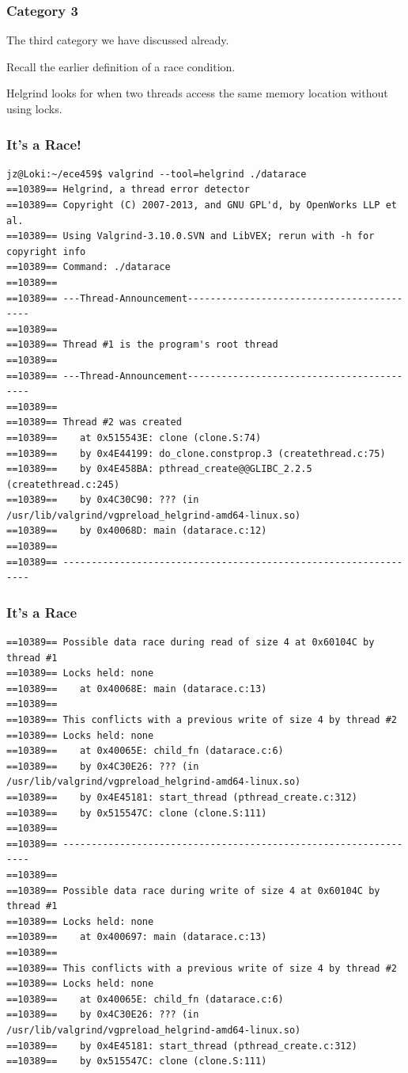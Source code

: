 \begin{frame}
\frametitle{Category 3}

The third category we have discussed already.

  Recall the earlier definition of a race condition. 

 Helgrind looks for when two threads access the same memory location without using locks.

\end{frame}

\begin{frame}[fragile]
\frametitle{It's a Race!}
{\scriptsize
\begin{verbatim}
jz@Loki:~/ece459$ valgrind --tool=helgrind ./datarace
==10389== Helgrind, a thread error detector
==10389== Copyright (C) 2007-2013, and GNU GPL'd, by OpenWorks LLP et al.
==10389== Using Valgrind-3.10.0.SVN and LibVEX; rerun with -h for copyright info
==10389== Command: ./datarace
==10389== 
==10389== ---Thread-Announcement------------------------------------------
==10389== 
==10389== Thread #1 is the program's root thread
==10389== 
==10389== ---Thread-Announcement------------------------------------------
==10389== 
==10389== Thread #2 was created
==10389==    at 0x515543E: clone (clone.S:74)
==10389==    by 0x4E44199: do_clone.constprop.3 (createthread.c:75)
==10389==    by 0x4E458BA: pthread_create@@GLIBC_2.2.5 (createthread.c:245)
==10389==    by 0x4C30C90: ??? (in /usr/lib/valgrind/vgpreload_helgrind-amd64-linux.so)
==10389==    by 0x40068D: main (datarace.c:12)
==10389== 
==10389== ----------------------------------------------------------------
\end{verbatim}
}

\end{frame}

\begin{frame}[fragile]
\frametitle{It's a Race}
{\scriptsize
\begin{verbatim}
==10389== Possible data race during read of size 4 at 0x60104C by thread #1
==10389== Locks held: none
==10389==    at 0x40068E: main (datarace.c:13)
==10389== 
==10389== This conflicts with a previous write of size 4 by thread #2
==10389== Locks held: none
==10389==    at 0x40065E: child_fn (datarace.c:6)
==10389==    by 0x4C30E26: ??? (in /usr/lib/valgrind/vgpreload_helgrind-amd64-linux.so)
==10389==    by 0x4E45181: start_thread (pthread_create.c:312)
==10389==    by 0x515547C: clone (clone.S:111)
==10389== 
==10389== ----------------------------------------------------------------
==10389== 
==10389== Possible data race during write of size 4 at 0x60104C by thread #1
==10389== Locks held: none
==10389==    at 0x400697: main (datarace.c:13)
==10389== 
==10389== This conflicts with a previous write of size 4 by thread #2
==10389== Locks held: none
==10389==    at 0x40065E: child_fn (datarace.c:6)
==10389==    by 0x4C30E26: ??? (in /usr/lib/valgrind/vgpreload_helgrind-amd64-linux.so)
==10389==    by 0x4E45181: start_thread (pthread_create.c:312)
==10389==    by 0x515547C: clone (clone.S:111)
\end{verbatim}
}
\end{frame}

